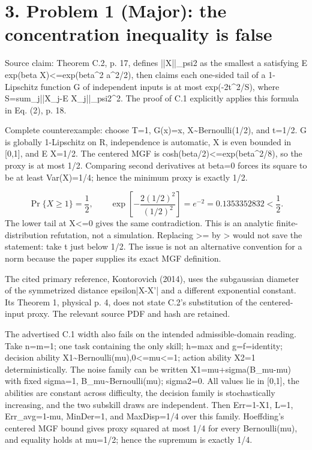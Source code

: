 \documentclass[10pt]{article}
\begin{document}
\section*{3. Problem 1 (Major): the concentration inequality is false}
Source claim: Theorem C.2, p. 17, defines ||X||\_psi2 as the smallest a satisfying E exp(beta X)<=exp(beta\textasciicircum{}2 a\textasciicircum{}2/2), then claims each one-sided tail of a 1-Lipschitz function G of independent inputs is at most exp(-2t\textasciicircum{}2/S), where S=sum\_j||X\_j-E X\_j||\_psi2\textasciicircum{}2. The proof of C.1 explicitly applies this formula in Eq. (2), p. 18.\par
Complete counterexample: choose T=1, G(x)=x, X\textasciitilde{}Bernoulli(1/2), and t=1/2. G is globally 1-Lipschitz on R, independence is automatic, X is even bounded in [0,1], and E X=1/2. The centered MGF is cosh(beta/2)<=exp(beta\textasciicircum{}2/8), so the proxy is at most 1/2. Comparing second derivatives at beta=0 forces its square to be at least Var(X)=1/4; hence the minimum proxy is exactly 1/2.\par
\[\Pr\{X\ge1\}=\frac12,\qquad \exp\!\left[-\frac{2(1/2)^2}{(1/2)^2}\right]=e^{-2}=0.1353352832<\frac12.\] The lower tail at X<=0 gives the same contradiction. This is an analytic finite-distribution refutation, not a simulation. Replacing >= by > would not save the statement: take t just below 1/2. The issue is not an alternative convention for a norm because the paper supplies its exact MGF definition.\par
The cited primary reference, Kontorovich (2014), uses the subgaussian diameter of the symmetrized distance epsilon|X-X’| and a different exponential constant. Its Theorem 1, physical p. 4, does not state C.2’s substitution of the centered-input proxy. The relevant source PDF and hash are retained.\par
The advertised C.1 width also fails on the intended admissible-domain reading. Take n=m=1; one task containing the only skill; h=max and g=f=identity; decision ability X1\textasciitilde{}Bernoulli(mu),0<=mu<=1; action ability X2=1 deterministically. The noise family can be written X1=mu+sigma(B\_mu-mu) with fixed sigma=1, B\_mu\textasciitilde{}Bernoulli(mu); sigma2=0. All values lie in [0,1], the abilities are constant across difficulty, the decision family is stochastically increasing, and the two subskill draws are independent. Then Err=1-X1, L=1, Err\_avg=1-mu, MinDer=1, and MaxDisp=1/4 over this family. Hoeffding’s centered MGF bound gives proxy squared at most 1/4 for every Bernoulli(mu), and equality holds at mu=1/2; hence the supremum is exactly 1/4.\par
\end{document}
